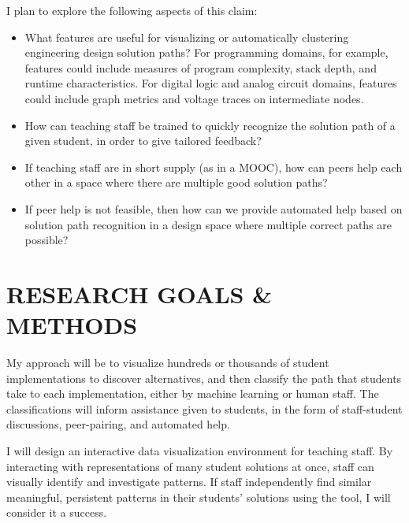 \documentclass[12pt]{article}
\begin{document}
I plan to explore the following aspects of this claim:
\begin{itemize}
\item What features are useful for visualizing or automatically clustering engineering design solution paths? For programming domains, for example, features could include measures of program complexity, stack depth, and runtime characteristics. For digital logic and analog circuit domains, features could include graph metrics and voltage traces on intermediate nodes.
\item How can teaching staff be trained to quickly recognize the solution path of a given student, in order to give tailored feedback?
\item If teaching staff are in short supply (as in a MOOC), how can peers help each other in a space where there are multiple good solution paths?
\item If peer help is not feasible, then how can we provide automated help based on solution path recognition in a design space where multiple correct paths are possible?
\end{itemize}


\section{RESEARCH GOALS \& METHODS}

My approach will be to visualize hundreds or thousands of student implementations to discover alternatives, and then classify the path that students take to each implementation, either by machine learning or human staff. The classifications will inform assistance given to students, in the form of staff-student discussions, peer-pairing, and automated help. 


I will design an interactive data visualization environment for teaching staff. By interacting with representations of many student solutions at once, staff can visually identify and investigate patterns. If staff independently find similar meaningful, persistent patterns in their students' solutions using the tool, I will consider it a success.
\end{document}
